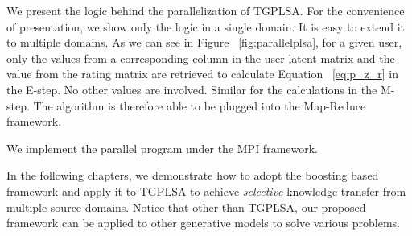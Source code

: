 We present the logic behind the parallelization of TGPLSA. For the convenience of presentation, we show only the logic in a single domain. It is easy to extend it to multiple domains. As we can see in Figure ~\ref{fig:parallelplsa}, for a given user, only the values from a corresponding column in the user latent matrix and the value from the rating matrix are retrieved to calculate Equation ~\ref{eq:p_z_r} in the E-step. No other values are involved. Similar for the calculations in the M-step. The algorithm is therefore able to be plugged into the Map-Reduce framework.

We implement the parallel program under the MPI framework.

In the following chapters, we demonstrate how to adopt the boosting based framework and apply it to TGPLSA to achieve {\em selective} knowledge transfer from multiple source domains. Notice that other than TGPLSA, our proposed framework can be applied to other generative models to solve various problems.


